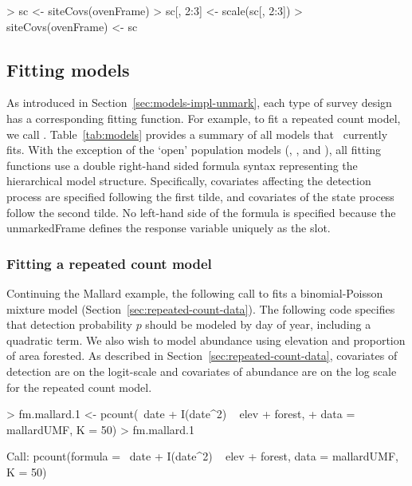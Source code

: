 \documentclass[article,shortnames]{jss}
\newcommand{\um}{\pkg{unmarked}}
\begin{document}
{\begin{Schunk}
\begin{Sinput}
> sc <- siteCovs(ovenFrame)
> sc[, 2:3] <- scale(sc[, 2:3])
> siteCovs(ovenFrame) <- sc
\end{Sinput}
\end{Schunk}



\subsection{Fitting models}
\label{sec:fitting-models}

As introduced in Section~\ref{sec:models-impl-unmark}, each type of
survey design
has a corresponding fitting function.  For example, to fit a repeated count
model, we call .  Table~\ref{tab:models} provides a
summary of all models that \um\ currently fits.  With the exception of the
`open' population models (, , and
), all fitting functions use a double right-hand sided
formula syntax representing the hierarchical model structure.
Specifically, covariates affecting the detection process are specified
following the first tilde, and covariates of the state process follow the
second tilde. No left-hand side of the formula is specified because the
unmarkedFrame defines the response variable uniquely as the  slot.

\subsubsection{Fitting a repeated count model}

Continuing the Mallard example, the following call to  fits a
binomial-Poisson mixture model (Section~\ref{sec:repeated-count-data}).  The
following code specifies that detection probability $p$ should be modeled by
day of year, including a quadratic term.  We also wish to model abundance
using elevation and proportion of area forested.  As described in
Section~\ref{sec:repeated-count-data}, covariates of detection are on the
logit-scale and covariates of abundance are on the log scale for the
repeated count model.

\begin{Schunk}
\begin{Sinput}
> fm.mallard.1 <- pcount(~date + I(date^2) ~ elev + forest, 
+     data = mallardUMF, K = 50)
> fm.mallard.1
\end{Sinput}
\begin{Soutput}
Call:
pcount(formula = ~date + I(date^2) ~ elev + forest, data = mallardUMF, 
    K = 50)


\end{Soutput}
\end{Schunk}}
\end{document}
